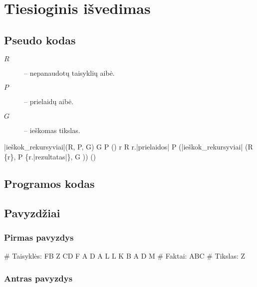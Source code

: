 \chapter{Tiesioginis išvedimas}

\section{Pseudo kodas}

\begin{description}
  \item[$R$] – nepanaudotų taisyklių aibė.
  \item[$P$] – prielaidų aibė.
  \item[$G$] – ieškomas tikslas.
\end{description}
\begin{program}
  \FUNCT |ieškok_rekursyviai|(R, P, G) \BODY
    \IF G \in P \THEN \EXIT(\true) \FI
    \FOREACH r \in R \; \DO
      \IF r.|prielaidos| \subseteq P
      \THEN \EXIT(|ieškok_rekursyviai|%
        (R \setminus \{r\}, P \cup \{r.|rezultatas|\}, G ))
      \FI
    \OD
    \EXIT(\false)%
  \ENDFUNCT
\end{program}

\section{Programos kodas}


\section{Pavyzdžiai}

\subsection{Pirmas pavyzdys}

\begin{pythonaienv}[fc]
# Taisyklės:
FB Z
CD F
A D
A L
L K
B A
D M
# Faktai:
ABC
# Tikslas:
Z
\end{pythonaienv}

\subsection{Antras pavyzdys}

